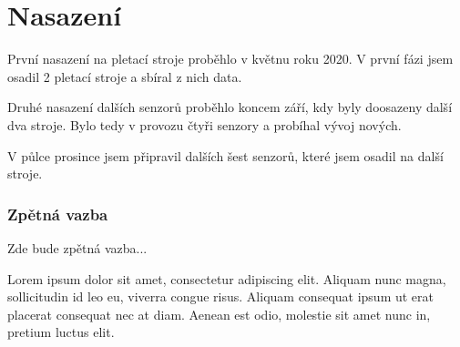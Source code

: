 \chapter{Nasazení}
První nasazení na pletací stroje proběhlo v květnu roku 2020.
V první fázi jsem osadil 2 pletací stroje a sbíral z nich data.

Druhé nasazení dalších senzorů proběhlo koncem září, kdy byly doosazeny další dva stroje.
Bylo tedy v provozu čtyři senzory a probíhal vývoj nových.

V půlce prosince jsem připravil dalších šest senzorů, které jsem osadil na další stroje.


\subsection{Zpětná vazba}
Zde bude zpětná vazba...

Lorem ipsum dolor sit amet, consectetur adipiscing elit.
Aliquam nunc magna, sollicitudin id leo eu, viverra congue risus.
Aliquam consequat ipsum ut erat placerat consequat nec at diam. 
Aenean est odio, molestie sit amet nunc in, pretium luctus elit. 




\newpage